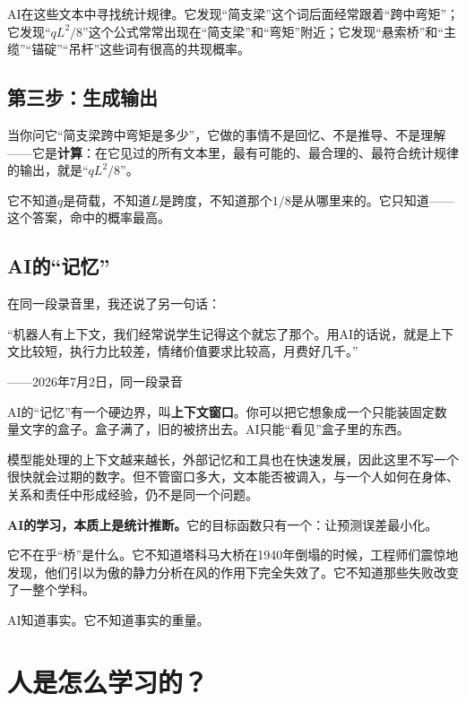 AI在这些文本中寻找统计规律。它发现“简支梁”这个词后面经常跟着“跨中弯矩”；它发现“$qL^2/8$”这个公式常常出现在“简支梁”和“弯矩”附近；它发现“悬索桥”和“主缆”“锚碇”“吊杆”这些词有很高的共现概率。

\subsection{第三步：生成输出}

当你问它“简支梁跨中弯矩是多少”，它做的事情不是回忆、不是推导、不是理解——它是\textbf{计算}：在它见过的所有文本里，最有可能的、最合理的、最符合统计规律的输出，就是“$qL^2/8$”。

它不知道$q$是荷载，不知道$L$是跨度，不知道那个$1/8$是从哪里来的。它只知道——这个答案，命中的概率最高。

\subsection{AI的“记忆”}

在同一段录音里，我还说了另一句话：

\begin{shiyu-inline}
“机器人有上下文，我们经常说学生记得这个就忘了那个。用AI的话说，就是上下文比较短，执行力比较差，情绪价值要求比较高，月费好几千。”

\hfill ——2026年7月2日，同一段录音
\end{shiyu-inline}

AI的“记忆”有一个硬边界，叫\textbf{上下文窗口}。你可以把它想象成一个只能装固定数量文字的盒子。盒子满了，旧的被挤出去。AI只能“看见”盒子里的东西。

模型能处理的上下文越来越长，外部记忆和工具也在快速发展，因此这里不写一个很快就会过期的数字。但不管窗口多大，文本能否被调入，与一个人如何在身体、关系和责任中形成经验，仍不是同一个问题。

\begin{insight}
\label{insight:chap1}

\textbf{AI的学习，本质上是统计推断。}它的目标函数只有一个：让预测误差最小化。

它不在乎“桥”是什么。它不知道塔科马大桥在1940年倒塌的时候，工程师们震惊地发现，他们引以为傲的静力分析在风的作用下完全失效了。它不知道那些失败改变了一整个学科。

AI知道事实。它不知道事实的重量。
\end{insight}

\section{人是怎么学习的？}

